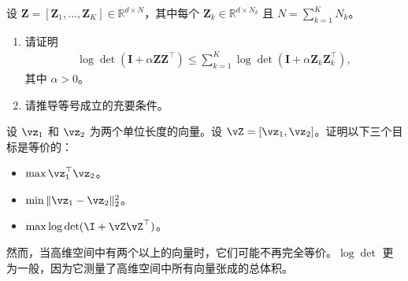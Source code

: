 \documentclass[../../book-main_zh.tex]{subfiles}
\begin{document}
\begin{exercise}
    设 $\bm Z = [\bm Z_1, \dots, \bm Z_K] \in \mathbb{R}^{d \times N}$，其中每个 $\bm Z_k \in \mathbb{R}^{d \times N_k}$ 且 $N = \sum_{k=1}^K N_k$。

    \begin{enumerate}
        \item 请证明
            \begin{align*}
                \log\det\left( \bm I + \alpha \bm Z \bm Z^\top \right)
                \le
                \sum_{k=1}^K
                \log\det\left( \bm I + \alpha \bm Z_k \bm Z_k^\top \right),
            \end{align*}
            其中 $\alpha > 0$。

        \item 请推导等号成立的充要条件。
    \end{enumerate}

\end{exercise}

\begin{exercise}
    设 $\vz_1$ 和 $\vz_2$ 为两个单位长度的向量。设 $\vZ = [\vz_1, \vz_2]$。证明以下三个目标是等价的：
    \begin{itemize}
        \item $\max \vz_1^\top \vz_2$。
        \item $\min \|\vz_1 - \vz_2\|_2^2$。
        \item $\max \log \det (\I + \vZ\vZ^\top)$。
    \end{itemize}
    然而，当高维空间中有两个以上的向量时，它们可能不再完全等价。$\log\det$ 更为一般，因为它测量了高维空间中所有向量张成的总体积。
\end{exercise}

\end{document}
